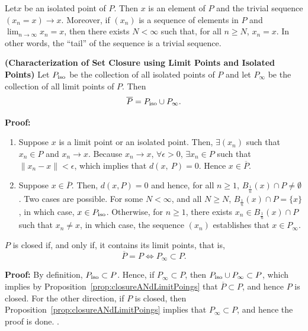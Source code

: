 \begin{rem}
    Let$x$ be an isolated point of $P$. Then $x$ is an element of $P$ and the trivial sequence $(x_n=x) \to x$. Moreover, if $(x_n)$ is a sequence of elements in $P$ and $\lim_{n \to \infty} x_n = x$, then there exists $N <\infty$ such that, for all $n \ge N$, $x_n = x$. In other words, the ``tail'' of the sequence is a trivial sequence. 
\end{rem}

\begin{prop} \textbf{(Characterization of Set Closure using Limit Points and Isolated Points)}
\label{prop:closureANdLimitPoings} 
Let $P_{\rm iso}$ be the collection of all isolated points of $P$ and let $P_{\infty}$ be the collection of all limit points of $P$. Then $$\overline{P} = P_{\rm iso} \cup P_{\infty}.$$
\end{prop} 

\textbf{Proof:} 
    \begin{enumerate}
        \item Suppose $x$ is a limit point or an isolated point. Then, $\exists (x_n)$ such that $x_n\in P$ and $x_n\to x$. Because $x_n\to x$, $\forall \epsilon>0$, $\exists x_n\in P$ such that $\|x_n-x\|<\epsilon$, which implies that $d(x,\ P)=0$. Hence $x\in\overline{P}$.
        \item Suppose $x\in\overline{P}$. Then, $d(x, P)=0$ and hence, for all $n\ge 1$, $B_{ \frac{1}{n} } (x) \cap P \neq \emptyset$. Two cases are possible. For some $N < \infty$, and all $N\ge N$, $B_{ \frac{1}{n} } (x) \cap P =\{x\}$, in which case, $x \in P_{\rm iso}$. Otherwise, for $n\ge 1$, there exists $x_n\in B_{ \frac{1}{n} } (x) \cap P$ such that $x_n \neq x$, in which case, the sequence $(x_n)$ establishes that $x \in  P_{\infty}$.
    \end{enumerate}

\begin{cor}
\label{cor:ClosureAndLimitPoints}
$P$ is closed if, and only if,  it contains its limit points, that is, $$\overline{P}=P \iff P_\infty \subset P. $$
\end{cor} 

% 
\textbf{Proof:} By definition, $P_{\rm iso} \subset P$. Hence, if  $P_\infty \subset P$, then $P_{\rm iso} \cup P_{\infty} \subset P$, which implies by Proposition~\ref{prop:closureANdLimitPoings} that $\overline{P} \subset P$, and hence $P$ is closed. For the other direction, if $P$ is closed, then Proposition~\ref{prop:closureANdLimitPoings} implies that $P_\infty \subset P$, and hence the proof is done. 
\Qed. 

